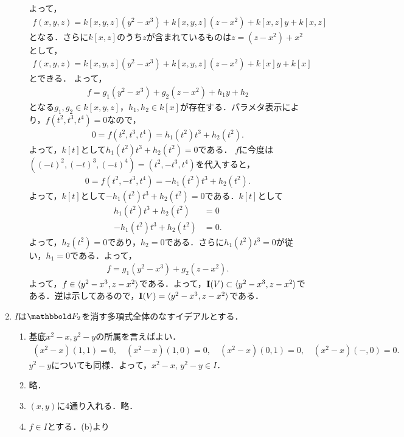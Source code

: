 \documentclass[9pt]{ltjsarticle}
\theoremstyle{break}
\theoremstyle{break}
\theoremstyle{break}
\theoremstyle{break}
\theoremstyle{break}
\theoremstyle{break}
\theoremstyle{break}
\theoremstyle{break}
\theoremstyle{break}
\theoremstyle{break}
\theoremstyle{break}
\theoremstyle{break}
\theoremstyle{break}
\theoremstyle{break}
\theoremstyle{break}
\theoremstyle{nonumberbreak}
\theoremstyle{nonumberbreak}
\begin{document}
\begin{enumerate}[label=(問題\arabic*)]
\begin{enumerate}[label=(\alph*)]
よって，
\begin{align}
 f(x,y,z) = k[x,y,z](y^2-x^3) + k[x,y,z](z-x^2) + k[x,z]y + k[x,z]
\end{align}
となる．さらに$k[x,z]$のうち$z$が含まれているものは$z=(z-x^2)+x^2$として，
\begin{align}
 f(x,y,z) = k[x,y,z](y^2-x^3) + k[x,y,z](z-x^2) + k[x]y + k[x]
\end{align}
とできる．
よって，
\begin{align}
 f = g_1(y^2-x^3) + g_2(z-x^2) + h_1 y + h_2
\end{align}
となる$g_1,g_2\in k[x,y,z]$，$h_1,h_2 \in k[x]$が存在する．パラメタ表示により，$f(t^2,t^3,t^4)=0$なので，
\begin{align}
0 = f(t^2,t^3,t^4) = h_1(t^2) t^3 + h_2(t^2).
\end{align}
よって，$k[t]$として$h_1(t^2)t^3 + h_2(t^2)=0$である．
$f$に今度は$((-t)^2,(-t)^3,(-t)^4)=(t^2,-t^3,t^4)$を代入すると，
\begin{align}
 0=f(t^2,-t^3,t^4) = -h_1(t^2)t^3 + h_2(t^2).
\end{align}
よって，$k[t]$として$-h_1(t^2)t^3 + h_2(t^2)=0$である．$k[t]$として
\begin{align}
 h_1(t^2)t^3 + h_2(t^2) &= 0\\
 -h_1(t^2)t^3 + h_2(t^2)& =0.
\end{align}
よって，$h_2(t^2)=0$であり，$h_2 = 0$である．さらに$h_1(t^2)t^3=0$が従い，$h_1=0$である．よって，
\begin{align}
 f = g_1(y^2-x^3) + g_2(z-x^2).
\end{align}
よって，$f\in \langle y^2-x^3,z-x^2 \rangle$である．よって，$\textbf I(V)\subset \langle y^2-x^3,z-x^2 \rangle$である．逆は示してあるので，$\textbf I(V)=\langle y^2-x^3,z-x^2 \rangle$である．
\end{enumerate}
 \item $I$は$\F_2$を消す多項式全体のなすイデアルとする．
\begin{enumerate}[label=(\alph*)]
 \item 基底$x^2-x,y^2-y$の所属を言えばよい．
\begin{align}
 (x^2-x)(1,1) = 0,\quad (x^2-x)(1,0) = 0,\quad (x^2-x)(0,1) = 0,\quad (x^2-x)(-,0) = 0.
\end{align}
$y^2-y$についても同様．よって，$x^2-x,\,y^2-y \in I$．
 \item 略．
 \item $(x,y)$に4通り入れる．略．
 \item $f\in I$とする．(b)より
\begin{align}

\end{align}
\end{enumerate}
\end{enumerate}
\end{document}
